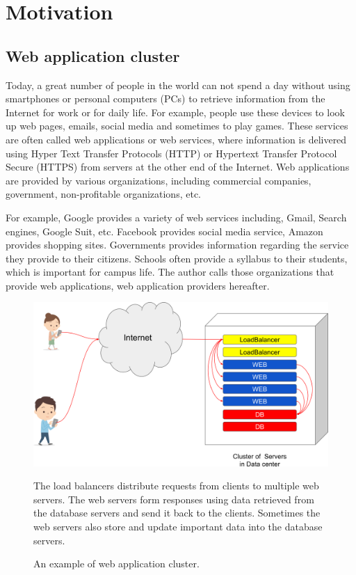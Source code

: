 
\section{Motivation}

\subsection{Web application cluster}

Today, a great number of people in the world can not spend a day without using smartphones or personal computers (PCs) to retrieve information from the Internet for work or for daily life.
For example, people use these devices to look up web pages, emails, social media and sometimes to play games.
These services are often called web applications or web services, where information is delivered using Hyper Text Transfer Protocols (HTTP) or Hypertext Transfer Protocol Secure (HTTPS) from servers at the other end of the Internet.
Web applications are provided by various organizations, including commercial companies, government, non-profitable organizations, etc.

For example, Google provides a variety of web services including, Gmail, Search engines, Google Suit, etc.
Facebook provides social media service, Amazon provides shopping sites.
Governments provides information regarding the service they provide to their citizens.
Schools often provide a syllabus to their students, which is important for campus life.
The author calls those organizations that provide web applications, web application providers hereafter.

\begin{figure}[h]
\begin{center}
\includegraphics[width=0.8\columnwidth]{Figs/web_cluster.png}
\end{center}
\caption{
An example of web application cluster.
}
\centering\parbox[c]{0.9\columnwidth}{
The load balancers distribute requests from clients to multiple web servers.
The web servers form responses using data retrieved from the database servers and send it back to the clients.
Sometimes the web servers also store and update important data into the database servers.
}
\label{fig:web_cluster}
\end{figure}

